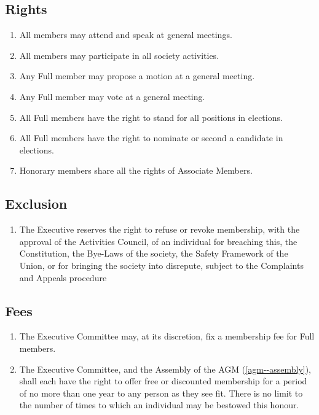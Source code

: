 \documentclass{scrartcl}
\begin{document}
        \subsection{Rights}
            \label{membership--rights}
            \begin{enumerate}
                \item All members may attend and speak at general meetings.
                \item All members may participate in all society activities.
                \item Any Full member may propose a motion at a general meeting.
                \item Any Full member may vote at a general meeting.
                \item All Full members have the right to stand for all positions in elections.
                \item All Full members have the right to nominate or second a candidate in elections.
                \item Honorary members share all the rights of Associate Members.
            \end{enumerate}

        \subsection{Exclusion}
            \label{membership--exclusion}
            \begin{enumerate}
                \item The Executive reserves the right to refuse or revoke membership, with the approval of the Activities Council, of an individual for breaching this, the Constitution, the Bye-Laws of the society, the Safety Framework of the Union, or for bringing the society into disrepute, subject to the Complaints and Appeals procedure 
            \end{enumerate}

        \subsection{Fees}
            \label{membership--fees}
            \begin{enumerate}
                \item The Executive Committee may, at its discretion, fix a membership fee for Full members.
                \item The Executive Committee, and the Assembly of the AGM (\ref{agm--assembly}), shall each have the right to offer free or discounted membership for a period of no more than one year to any person as they see fit. There is no limit to the number of times to which an individual may be bestowed this honour.
            \end{enumerate}
\end{document}
